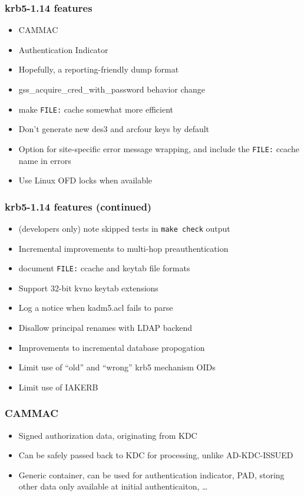 \documentclass{beamer}
\begin{document}
\begin{frame}[fragile]
\frametitle{krb5-1.14 features}
\begin{itemize}
\item{CAMMAC}
\item{Authentication Indicator}
\item{Hopefully, a reporting-friendly dump format}
\item{gss\_acquire\_cred\_with\_password behavior change}
\item{make \verb+FILE:+ cache somewhat more efficient}
\item{Don't generate new des3 and arcfour keys by default}
\item{Option for site-specific error message wrapping, and include the
	\verb+FILE:+ ccache name in errors}
\item{Use Linux OFD locks when available}
\end{itemize}
\end{frame}
\begin{frame}[fragile]
\frametitle{krb5-1.14 features (continued)}
\begin{itemize}
\item{(developers only) note skipped tests in \verb+make check+ output}
\item{Incremental improvements to multi-hop preauthentication}
\item{document \verb+FILE:+ ccache and keytab file formats}
\item{Support 32-bit kvno keytab extensions}
\item{Log a notice when kadm5.acl fails to parse}
\item{Disallow principal renames with LDAP backend}
\item{Improvements to incremental database propogation}
\item{Limit use of ``old'' and ``wrong'' krb5 mechanism OIDs}
\item{Limit use of IAKERB}
\end{itemize}
\end{frame}

\begin{frame}
\frametitle{CAMMAC}
\begin{itemize}
\item{Signed authorization data, originating from KDC}
\item{Can be safely passed back to KDC for processing, unlike
	AD-KDC-ISSUED}
\item{Generic container, can be used for authentication indicator,
	PAD, storing other data only available at initial authenticaiton,
	\ldots{}}
\end{itemize}
\end{frame}
\end{document}
